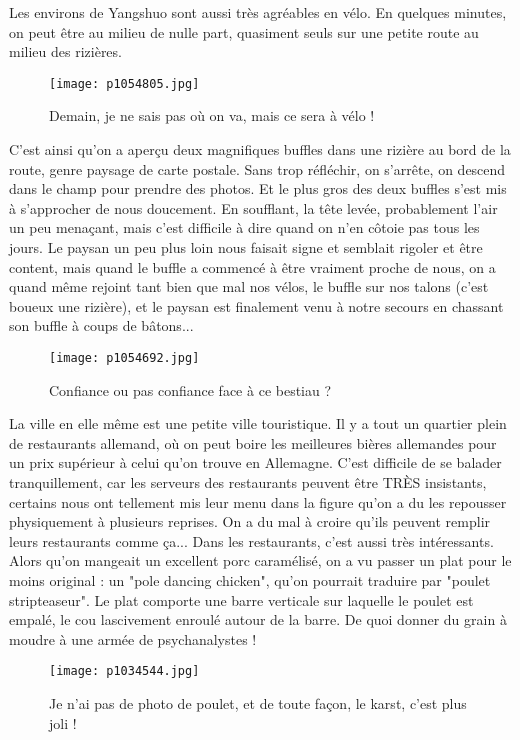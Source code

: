 \documentclass{book}
\begin{document}
Les environs de Yangshuo sont aussi très agréables en vélo. En quelques minutes, on peut être au milieu de nulle part, quasiment seuls sur une petite route au milieu des rizières.


\begin{figure}[h]
\centering
\texttt{[image: p1054805.jpg]}
\caption*{Demain, je ne sais pas où on va, mais ce sera à vélo !}
\end{figure}

C'est ainsi qu'on a aperçu deux magnifiques buffles dans une rizière au bord de la route, genre paysage de carte postale. Sans trop réfléchir, on s'arrête, on descend dans le champ pour prendre des photos. Et le plus gros des deux buffles s'est mis à s'approcher de nous doucement. En soufflant, la tête levée, probablement l'air un peu menaçant, mais c'est difficile à dire quand on n'en côtoie pas tous les jours. Le paysan un peu plus loin nous faisait signe et semblait rigoler et être content, mais quand le buffle a commencé à être vraiment proche de nous, on a quand même rejoint tant bien que mal nos vélos, le buffle sur nos talons (c'est boueux une rizière), et le paysan est finalement venu à notre secours en chassant son buffle à coups de bâtons...


\begin{figure}[h]
\centering
\texttt{[image: p1054692.jpg]}
\caption*{Confiance ou pas confiance face à ce bestiau ?}
\end{figure}

La ville en elle même est une petite ville touristique. Il y a tout un quartier plein de restaurants allemand, où on peut boire les meilleures bières allemandes pour un prix supérieur à celui qu'on trouve en Allemagne. C'est difficile de se balader tranquillement, car les serveurs des restaurants peuvent être TRÈS insistants, certains nous ont tellement mis leur menu dans la figure qu'on a du les repousser physiquement à plusieurs reprises. On a du mal à croire qu'ils peuvent remplir leurs restaurants comme ça... Dans les restaurants, c'est aussi très intéressants. Alors qu'on mangeait un excellent porc caramélisé, on a vu passer un plat pour le moins original : un "pole dancing chicken", qu'on pourrait traduire par "poulet stripteaseur". Le plat comporte une barre verticale sur laquelle le poulet est empalé, le cou lascivement enroulé autour de la barre. De quoi donner du grain à moudre à une armée de psychanalystes !


\begin{figure}[h]
\centering
\texttt{[image: p1034544.jpg]}
\caption*{Je n'ai pas de photo de poulet, et de toute façon, le karst, c'est plus joli !}
\end{figure}
\end{document}
